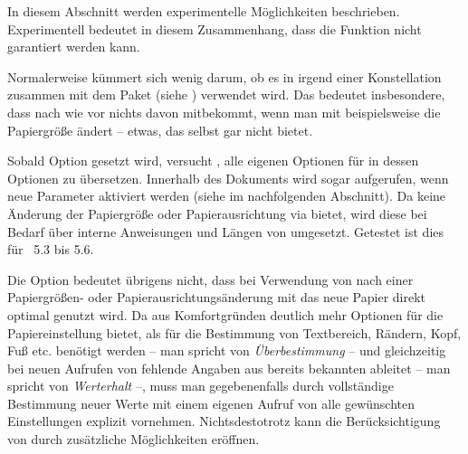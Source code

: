 In diesem Abschnitt werden experimentelle Möglichkeiten
beschrieben. Experimentell bedeutet in diesem Zusammenhang, dass die Funktion
nicht garantiert werden kann.
\iffalse %
Dafür kann es zwei Gründe geben. Zum einen
steht die endgültige Funktion oder Implementierung eventuell noch nicht
abschließend fest. Zum anderen hängen die Möglichkeiten teilweise von Interna
anderer Pakete ab und können deshalb in ihrer Funktion nur so lange garantiert
werden, wie diese anderen Pakete nicht geändert werden.
\fi

\begin{Declaration}
\end{Declaration}
Normalerweise kümmert sich  wenig darum, ob es in irgend
einer Konstellation zusammen mit dem Paket
 (siehe \cite{package:geometry})
verwendet wird. Das bedeutet insbesondere, dass  nach wie
vor nichts davon mitbekommt, wenn man mit  beispielsweise
die Papiergröße ändert -- etwas, das  selbst gar nicht
bietet.

Sobald Option 
gesetzt wird, versucht , alle eigenen Optionen für
 in dessen Optionen zu übersetzen. Innerhalb des Dokuments
wird sogar  aufgerufen, wenn neue Parameter aktiviert
werden (siehe  im nachfolgenden
Abschnitt). Da  keine Änderung der Papiergröße oder
Papierausrichtung via  bietet, wird diese bei Bedarf über
interne Anweisungen und Längen von  umgesetzt. Getestet ist
dies für ~5.3 bis 5.6.

Die Option bedeutet übrigens nicht, dass bei Verwendung von 
nach einer Papiergrößen- oder Papierausrichtungsänderung mit
 das neue Papier direkt optimal genutzt wird. Da
 aus Komfortgründen deutlich mehr Optionen für die
Papiereinstellung bietet, als für die Bestimmung von Textbereich, Rändern,
Kopf, Fuß etc. benötigt werden -- man spricht von \emph{Überbestimmung} -- und
gleichzeitig bei neuen Aufrufen von  fehlende Angaben aus
bereits bekannten ableitet -- man spricht von \emph{Werterhalt} --,
muss man gegebenenfalls durch vollständige Bestimmung neuer Werte
mit einem eigenen Aufruf von  alle gewünschten
Einstellungen explizit vornehmen. Nichtsdestotrotz kann die Berücksichtigung
von  durch  zusätzliche Möglichkeiten
eröffnen.

